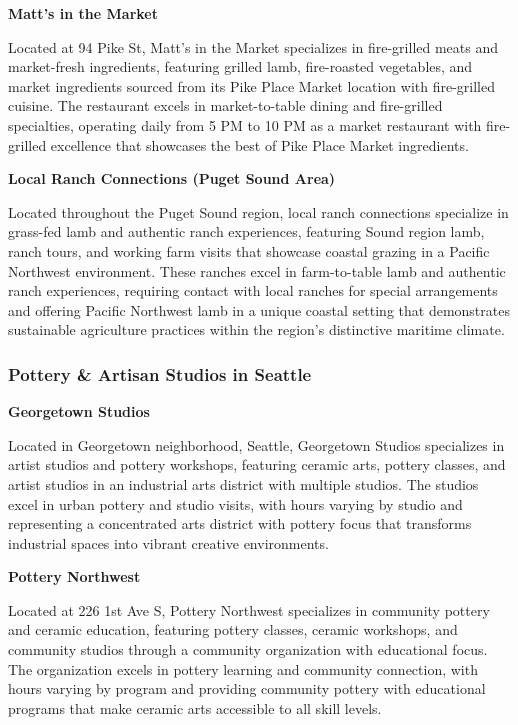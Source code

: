 \documentclass[
  11pt,
  letterpaper,
  DIV=10,
  numbers=noendperiod]{scrartcl}
\begin{document}
\textbf{Matt's in the Market}

Located at 94 Pike St, Matt's in the Market specializes in fire-grilled
meats and market-fresh ingredients, featuring grilled lamb, fire-roasted
vegetables, and market ingredients sourced from its Pike Place Market
location with fire-grilled cuisine. The restaurant excels in
market-to-table dining and fire-grilled specialties, operating daily
from 5 PM to 10 PM as a market restaurant with fire-grilled excellence
that showcases the best of Pike Place Market ingredients.

\textbf{Local Ranch Connections (Puget Sound Area)}

Located throughout the Puget Sound region, local ranch connections
specialize in grass-fed lamb and authentic ranch experiences, featuring
Sound region lamb, ranch tours, and working farm visits that showcase
coastal grazing in a Pacific Northwest environment. These ranches excel
in farm-to-table lamb and authentic ranch experiences, requiring contact
with local ranches for special arrangements and offering Pacific
Northwest lamb in a unique coastal setting that demonstrates sustainable
agriculture practices within the region's distinctive maritime climate.

\subsubsection{Pottery \& Artisan Studios in
Seattle}\label{pottery-artisan-studios-in-seattle}

\textbf{Georgetown Studios}

Located in Georgetown neighborhood, Seattle, Georgetown Studios
specializes in artist studios and pottery workshops, featuring ceramic
arts, pottery classes, and artist studios in an industrial arts district
with multiple studios. The studios excel in urban pottery and studio
visits, with hours varying by studio and representing a concentrated
arts district with pottery focus that transforms industrial spaces into
vibrant creative environments.

\textbf{Pottery Northwest}

Located at 226 1st Ave S, Pottery Northwest specializes in community
pottery and ceramic education, featuring pottery classes, ceramic
workshops, and community studios through a community organization with
educational focus. The organization excels in pottery learning and
community connection, with hours varying by program and providing
community pottery with educational programs that make ceramic arts
accessible to all skill levels.
\end{document}
